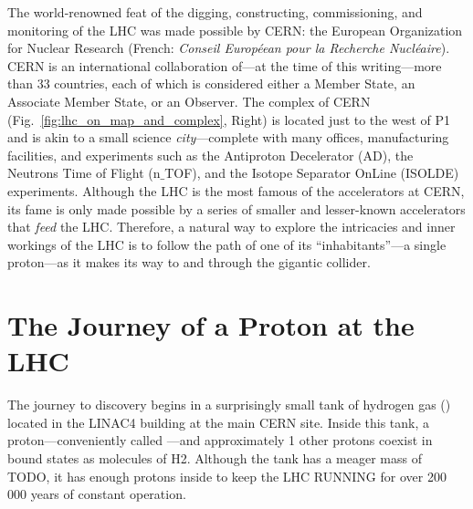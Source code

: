 The world-renowned feat of the digging, constructing, commissioning, and monitoring of the LHC was made possible by CERN:
the European Organization for Nuclear Research (French: \emph{Conseil Européean pour la Recherche Nucléaire}).
CERN is an international collaboration of---at the time of this writing---more than 33 countries,
each of which is considered either a Member State, an Associate Member State, or an Observer.
The complex of CERN (Fig.~\ref{fig:lhc_on_map_and_complex}, Right) is located just to the west of P1 and is akin to a small science \emph{city}---complete with many offices, manufacturing facilities, and experiments such as the Antiproton Decelerator (AD), the Neutrons Time of Flight (n$\_$TOF), and the Isotope Separator OnLine (ISOLDE) experiments.
Although the LHC is the most famous of the accelerators at CERN, its fame is only made possible by a series of smaller and lesser-known accelerators that \emph{feed} the LHC.
Therefore, a natural way to explore the intricacies and inner workings of the LHC is to follow the path of one of its ``inhabitants''---a single proton---as it makes its way to and through the gigantic collider.

\section{The Journey of a Proton at the LHC}
The journey to discovery begins in a surprisingly small tank of hydrogen gas (\htwo) located in the LINAC4 building at the main CERN site.
Inside this tank, a proton---conveniently called \pname---and approximately 1 other protons coexist in bound states as molecules of H2.
Although the tank has a meager mass of TODO\Kg, it has enough protons inside to keep the LHC RUNNING for over 200\,000 years of constant operation.

